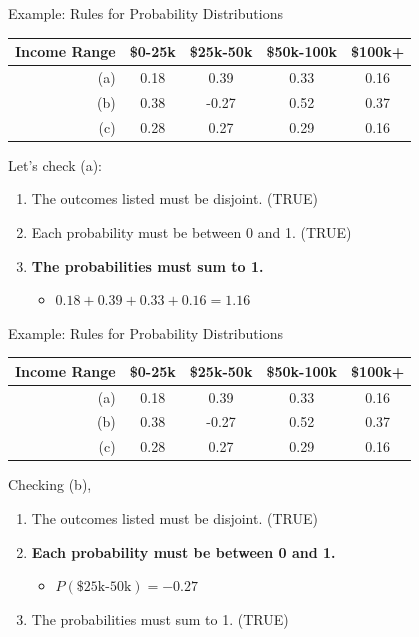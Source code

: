 \begin{frame}{Example: Rules for Probability Distributions}
    \begin{tabular}{r|cccc}
        \hline
        Income Range & \$0-25k & \$25k-50k & \$50k-100k & \$100k+ \\ \hline
        (a) & 0.18 & 0.39 & 0.33 & 0.16 \\
        (b) & 0.38 & -0.27 & 0.52 & 0.37 \\
        (c) & 0.28 & 0.27 & 0.29 & 0.16\\ \hline
    \end{tabular}
    
    \vspace{12pt}Let's check (a):
    \begin{enumerate}
        \item The outcomes listed must be disjoint. (TRUE)
        \item Each probability must be between 0 and 1. (TRUE)
        \item \textbf{The probabilities must sum to 1.}
        \begin{itemize}
            \item $0.18+0.39+0.33+0.16=1.16$
        \end{itemize}
    \end{enumerate}
\end{frame}

\begin{frame}{Example: Rules for Probability Distributions}
    \begin{tabular}{r|cccc}
        \hline
        Income Range & \$0-25k & \$25k-50k & \$50k-100k & \$100k+ \\ \hline
        (a) & 0.18 & 0.39 & 0.33 & 0.16 \\
        (b) & 0.38 & -0.27 & 0.52 & 0.37 \\
        (c) & 0.28 & 0.27 & 0.29 & 0.16\\ \hline
    \end{tabular}
    
    \vspace{12pt}Checking (b),
    \begin{enumerate}
        \item The outcomes listed must be disjoint. (TRUE)
        \item \textbf{Each probability must be between 0 and 1.}
        \begin{itemize}
            \item $P(\text{\$25k-50k})=-0.27$
        \end{itemize}
        \item The probabilities must sum to 1. (TRUE)
    \end{enumerate}
\end{frame}

